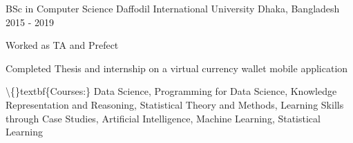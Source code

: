 
\begin{cventries}

  \cventry
    {BSc in Computer Science} 
    {Daffodil International University} 
    {Dhaka, Bangladesh} 
    {2015 - 2019} 
    {
      \begin{cvitems}
        \item {Worked as TA and Prefect}
        \item {Completed Thesis and internship on a virtual currency wallet mobile application}
        \item {\textbackslash\{\}textbf\{Courses:\} Data Science, Programming for Data Science, Knowledge Representation and Reasoning, Statistical Theory and Methods, Learning Skills through Case Studies, Artificial Intelligence, Machine Learning, Statistical Learning}
      \end{cvitems}
    }

\end{cventries}
